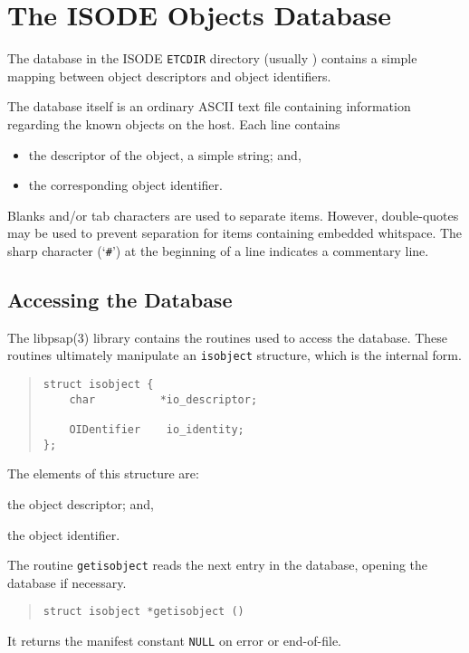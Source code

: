 
\chapter	{The ISODE Objects Database}\label{isobjects}
The database  in the ISODE \verb"ETCDIR" directory
(usually )
contains a simple mapping between
object descriptors and object identifiers.

The database itself is an ordinary ASCII text file containing information
regarding the known objects on the host.
Each line contains
\begin{itemize}
\item	the descriptor of the object, a simple string; and,

\item	the corresponding object identifier.
\end{itemize}
Blanks and/or tab characters are used to separate items.
However, double-quotes may be used to prevent separation for items containing
embedded whitspace.
The sharp character (`\verb"#"') at the beginning of a line indicates a
commentary line.

\section	{Accessing the Database}\label{isobject}
The \man libpsap(3) library contains the routines used to access the
database.
These routines ultimately manipulate an \verb"isobject" structure,
which is the internal form.
\begin{quote}\small\begin{verbatim}
struct isobject {
    char          *io_descriptor;

    OIDentifier    io_identity;
};
\end{verbatim}\end{quote}
The elements of this structure are:
\begin{describe}
\item[\verb"io\_descriptor":] the object descriptor; and,

\item[\verb"io\_identity":] the object identifier.
\end{describe}

The routine \verb"getisobject" reads the next entry in the database,
opening the database if necessary.
\begin{quote}\small\begin{verbatim}
struct isobject *getisobject ()
\end{verbatim}\end{quote}
It returns the manifest constant \verb"NULL" on error or end-of-file.

